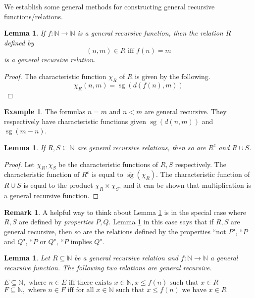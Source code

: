 \documentclass[12pt]{article}
\theoremstyle{plain}
\newtheorem{lemma}[thm]{Lemma}
\theoremstyle{definition}
\newtheorem{remark}[thm]{Remark}
\newtheorem{example}[thm]{Example}
\newcommand{\bb}[1]{\mathbb{#1}}
\newcommand{\lto}{\longrightarrow}
\begin{document}
We establish some general methods for constructing general recursive functions/relations.
	\begin{lemma}
		If $f: \bb{N} \lto \bb{N}$ is a general recursive function, then the relation $R$ defined by
		\begin{equation}
			(n,m) \in R \text{ iff } f(n) = m
		\end{equation}
		is a general recursive relation.
	\end{lemma}
	\begin{proof}
		The characteristic function $\chi_R$ of $R$ is given by the following.
		\begin{equation}
			\chi_R(n,m) = \operatorname{sg}(d(f(n),m))
		\end{equation}
	\end{proof}
	\begin{example}
		The formulas $n = m$ and $n < m$ are general recursive. They respectively have characteristic functions given $\operatorname{sg}(d(n,m))$ and $ \operatorname{sg}(m-n)$.
	\end{example}
	\begin{lemma}\label{lem:and_or}
		If $R,S \subseteq \bb{N}$ are general recursive relations, then so are $R^c$ and $R \cup S$.
	\end{lemma}
	\begin{proof}
		Let $\chi_R,\chi_S$ be the characteristic functions of $R,S$ respectively. The characteristic function of $R^c$ is equal to $\overline{\operatorname{sg}}(\chi_R)$. The characteristic function of $R \cup S$ is equal to the product $\chi_R \times \chi_S$, and it can be shown that multiplication is a general recursive function.
	\end{proof}
	\begin{remark}
		A helpful way to think about Lemma \ref{lem:and_or} is in the special case where $R,S$ are defined by \emph{properties} $P,Q$. Lemma \ref{lem:and_or} in this case says that if $R,S$ are general recursive, then so are the relations defined by the properties ``not $P$", ``$P$ and $Q$", ``$P$ or $Q$", ``$P$ implies $Q$".
	\end{remark}
	\begin{lemma}
		Let $R \subseteq \bb{N}$ be a general recursive relation and $f: \bb{N} \lto \bb{N}$ a general recursive function. The following two relations are general recursive.
		\begin{center}
			$E \subseteq \bb{N},\text{ where }n \in E\text{ iff there exists }x \in \bb{N}, x \leq f(n)\text{ such that }x \in R$\\
			$F \subseteq \bb{N},\text{ where }n \in F\text{ iff for all }x\in \bb{N}\text{ such that }x \leq f(n)\text{ we have }x \in R$
		\end{center}
	\end{lemma}
\end{document}
